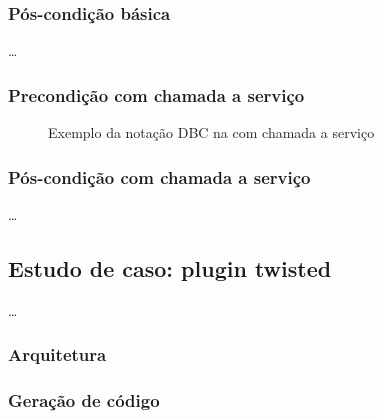 \subsubsection{Pós-condição básica}

\ldots



\subsubsection{Precondição com chamada a serviço}

\begin{figure}[htb]
\begin{small}

\end{small}
\caption{Exemplo da notação DBC na \neoidl{} com chamada a serviço}
\label{lst:DBCService}
\end{figure} 


\subsubsection{Pós-condição com chamada a serviço}

\ldots

\subsection{Estudo de caso: plugin twisted}

\ldots

\subsubsection{Arquitetura}



\subsubsection{Geração de código}